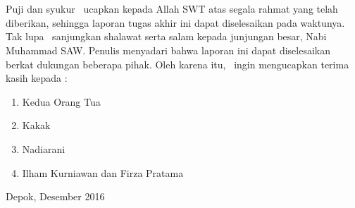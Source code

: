 \chapter*{\kataPengantar}

Puji dan syukur \saya~ucapkan kepada Allah SWT atas segala rahmat yang telah diberikan, sehingga laporan tugas akhir ini dapat diselesaikan pada waktunya. Tak lupa \saya~sanjungkan shalawat serta salam kepada junjungan besar, Nabi Muhammad SAW. Penulis menyadari bahwa laporan ini dapat diselesaikan berkat dukungan beberapa pihak. Oleh karena itu, \saya~ingin mengucapkan terima kasih kepada :

\begin{enumerate}
	\item Kedua Orang Tua \saya
	\item Kakak \saya
	\item Nadiarani
	\item Ilham Kurniawan dan Firza Pratama
	
\end{enumerate}
\vspace*{0.1cm}
\begin{flushright}
	Depok, Desember 2016\\[0.1cm]
	\vspace*{1cm}
	\penulis
	
\end{flushright}